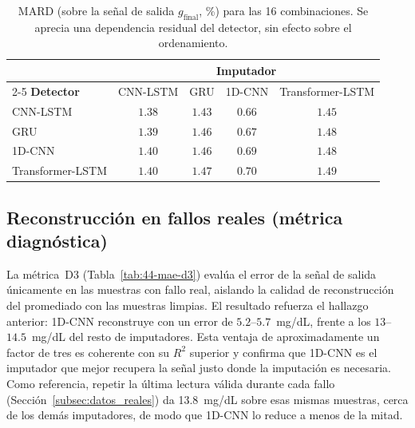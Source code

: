 \documentclass{report}
\begin{document}
\begin{table}[H]
\centering
\caption{MARD (sobre la señal de salida $g_{\text{final}}$, \%) para las 16 combinaciones. Se aprecia una dependencia residual del detector, sin efecto sobre el ordenamiento.}
\label{tab:44-mard}
\small
\begin{tabular}{lcccc}
\toprule
 & \multicolumn{4}{c}{\textbf{Imputador}} \\
\cmidrule(lr){2-5}
\textbf{Detector} & CNN-LSTM & GRU & 1D-CNN & Transformer-LSTM \\
\midrule
CNN-LSTM          & $1.38$ & $1.43$ & $0.66$ & $1.45$ \\
GRU               & $1.39$ & $1.46$ & $0.67$ & $1.48$ \\
1D-CNN            & $1.40$ & $1.46$ & $0.69$ & $1.48$ \\
Transformer-LSTM  & $1.40$ & $1.47$ & $0.70$ & $1.49$ \\
\bottomrule
\end{tabular}
\end{table}

\subsection{Reconstrucción en fallos reales (métrica diagnóstica)}
\label{subsec:d3}

La métrica~D3 (Tabla~\ref{tab:44-mae-d3}) evalúa el error de la señal de salida únicamente en las muestras con fallo real, aislando la calidad de reconstrucción del promediado con las muestras limpias. El resultado refuerza el hallazgo anterior: 1D-CNN reconstruye con un error de $5.2$–$5.7$~mg/dL, frente a los $13$–$14.5$~mg/dL del resto de imputadores. Esta ventaja de aproximadamente un factor de tres es coherente con su $R^2$ superior y confirma que 1D-CNN es el imputador que mejor recupera la señal justo donde la imputación es necesaria. Como referencia, repetir la última lectura válida durante cada fallo (Sección~\ref{subsec:datos_reales}) da 13.8~mg/dL sobre esas mismas muestras, cerca de los demás imputadores, de modo que 1D-CNN lo reduce a menos de la mitad.
\end{document}
